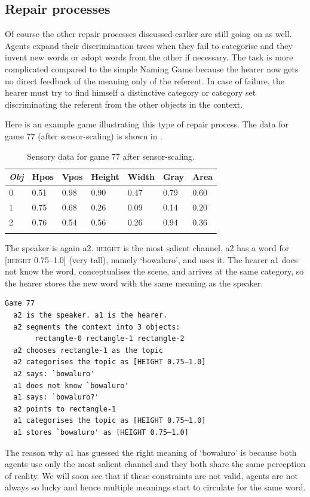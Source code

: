 \subsection{Repair processes}

Of course the other repair processes discussed earlier 
are still going on as well. Agents expand their 
discrimination trees when they fail to categorise and 
they invent new words or adopt words from the 
other if necessary. The task is more complicated compared
to the simple Naming Game because the hearer now gets
no direct feedback of the meaning only of the referent. 
In case of failure, the hearer must try to find himself a distinctive
category or category set discriminating the 
referent from the other objects in the context.

Here is an example game illustrating this
type of repair process. 
The data for game 77 (after sensor-scaling)
is shown in . 


\begin{table}
\begin{center}
\begin{tabular}{ l  l  l  l  l  l  l }
\lsptoprule
{\itshape Obj} & Hpos & Vpos & Height & Width & Gray & Area \\ \midrule
0 & 0.51 & 0.98 & 0.90 & 0.47 & 0.79 & 0.60\\ 
1 & 0.75 & 0.68 & 0.26 & 0.09 & 0.14 & 0.20\\ 
2 & 0.76 & 0.54 & 0.56 & 0.26 & 0.94 & 0.36\\ 
\lspbottomrule
\end{tabular}
\caption{\label{tab:game77}Sensory data for game 77 after sensor-scaling.}
\end{center}
\end{table}
The speaker is again {\bfshape  a2}. \textsc{height} is the most salient channel. 
{\bfshape  a2} has a word for [\textsc{height} 0.75–1.0] (very tall), namely
`bowaluro', and uses it. The hearer {\bfshape  a1} 
does not know the 
word, conceptualises the scene, and arrives at the 
same category, so the hearer stores the new word
with the same meaning as the speaker. 
\begin{verbatim}
Game 77
  a2 is the speaker. a1 is the hearer. 
  a2 segments the context into 3 objects: 
       rectangle-0 rectangle-1 rectangle-2
  a2 chooses rectangle-1 as the topic 
  a2 categorises the topic as [HEIGHT 0.75–1.0]
  a2 says: `bowaluro'
  a1 does not know `bowaluro'
  a1 says: `bowaluro?'
  a2 points to rectangle-1
  a1 categorises the topic as [HEIGHT 0.75–1.0]
  a1 stores `bowaluro' as [HEIGHT 0.75–1.0]
\end{verbatim}
The reason why {\bfshape  a1} has guessed the right 
meaning of `bowaluro' is because both agents use
only the most salient channel and they both share
the same perception of reality. We will soon see 
that if these constraints are not valid, agents 
are not always so lucky and hence multiple meanings
start to circulate for the same word. 


